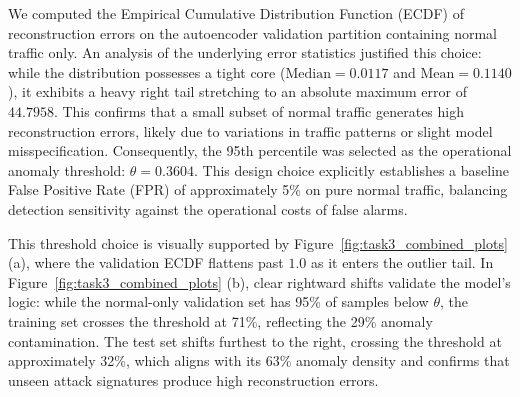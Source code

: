     We computed the Empirical Cumulative Distribution Function (ECDF) of reconstruction errors on the autoencoder validation partition containing normal traffic only. 
    An analysis of the underlying error statistics justified this choice: while the distribution possesses a tight core ($\text{Median} = 0.0117$ and $\text{Mean} = 0.1140$), it exhibits a heavy right tail stretching to an absolute maximum error of $44.7958$. 
    This confirms that a small subset of normal traffic generates high reconstruction errors, likely due to variations in traffic patterns or slight model misspecification. 
    Consequently, the 95th percentile was selected as the operational anomaly threshold: $\theta = 0.3604$. 
    This design choice explicitly establishes a baseline False Positive Rate (FPR) of approximately 5\% on pure normal traffic, balancing detection sensitivity against the operational costs of false alarms.

    
    This threshold choice is visually supported by Figure~\ref{fig:task3_combined_plots} (a), where the validation ECDF flattens past $1.0$ as it enters the outlier tail. 
    In Figure~\ref{fig:task3_combined_plots} (b), clear rightward shifts validate the model's logic: while the normal-only validation set has 95\% of samples below $\theta$, the training set crosses the threshold at 71\%, reflecting the 29\% anomaly contamination. 
    The test set shifts furthest to the right, crossing the threshold at approximately 32\%, which aligns with its 63\% anomaly density and confirms that unseen attack signatures produce high reconstruction errors.

